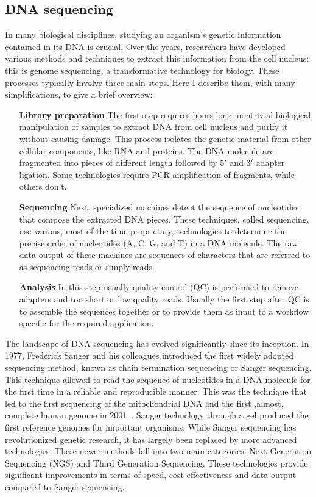 \subsection{DNA sequencing}
In many biological disciplines, studying an organism's genetic information contained in its DNA is crucial. Over the years, researchers have developed various methods and techniques to extract this information from the cell nucleus: this is genome sequencing, a transformative technology for biology. These processes typically involve three main steps. Here I describe them, with many simplifications, to give a brief overview:
\begin{itemize}[leftmargin=1.8cm]
	\item[\textbf{Library preparation}] The first step requires hours long, nontrivial biological manipulation of samples to extract DNA from cell nucleus and purify it without causing damage. This process isolates the genetic material from other cellular components, like RNA and proteins. The DNA molecule are fragmented into pieces of different length followed by $5\prime$ and $3\prime$ adapter ligation. Some technologies require PCR amplification of fragments, while others don't.
	\item[\textbf{Sequencing}] Next, specialized machines detect the sequence of nucleotides that compose the extracted DNA pieces. These techniques, called sequencing, use various, most of the time proprietary, technologies to determine the precise order of nucleotides (A, C, G, and T) in a DNA molecule. The raw data output of these machines are sequences of characters that are referred to as sequencing reads or simply reads.
	\item[\textbf{Analysis}] In this step usually quality control (QC) is performed to remove adapters and too short or low quality reads. Usually the first step after QC is to assemble the sequences together or to provide them as input to a workflow specific for the required application.
\end{itemize}
The landscape of DNA sequencing has evolved significantly since its inception. In 1977, Frederick Sanger and his colleagues introduced the first widely adopted sequencing method, known as chain termination sequencing or Sanger sequencing\cite{sanger_sequencing}. This technique allowed to read the sequence of nucleotides in a DNA molecule for the first time in a reliable and reproducible manner. This was the technique that led to the first sequencing of the mitochondrial DNA and the first ,almost, complete human genome in 2001~\cite{mitochondrialDNA,first_human_genome}. Sanger technology through a gel produced the first reference genomes for important organisms.
While Sanger sequencing has revolutionized genetic research, it has largely been replaced by more advanced technologies. These newer methods fall into two main categories: Next Generation Sequencing (NGS) and Third Generation Sequencing. These technologies provide significant improvements in terms of speed, cost-effectiveness and data output compared to Sanger sequencing. \\
